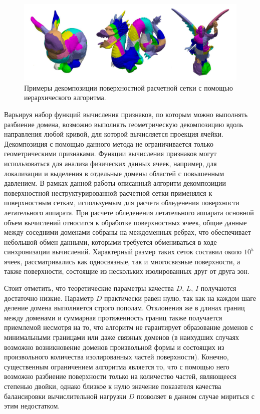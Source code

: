 \documentclass[
11pt,%
tightenlines,%
twoside,%
onecolumn,%
nofloats,%
nobibnotes,%
nofootinbib,%
superscriptaddress,%
noshowpacs,%
centertags]%
{revtex4}
\begin{document}
\begin{figure}[h]
\includegraphics[width=1.0\textwidth]{pics/03-hierarch.pdf}
\caption{Примеры декомпозиции поверхностной расчетной сетки с помощью иерархического алгоритма.}\label{fig:03-hierarch}
\end{figure}

Варьируя набор функций вычисления признаков, по которым можно выполнять разбиение домена, возможно выполнять геометрическую декомпозицию вдоль направления любой кривой, для которой вычисляется проекция ячейки.
Декомпозиция с помощью данного метода не ограничивается только геометрическими признаками.
Функции вычисления признаков могут использоваться для анализа физических данных ячеек, например, для локализации и выделения в отдельные домены областей с повышенным давлением.
В рамках данной работы описанный алгоритм декомпозиции поверхностной неструктурированной расчетной сетки применялся к поверхностным сеткам, используемым для расчета обледенения поверхности летательного аппарата.
При расчете обледенения летательного аппарата основной объем вычислений относится к обработке поверхностных ячеек, общие данные между соседними доменами собраны на междоменных ребрах, что обеспечивает небольшой обмен данными, которыми требуется обмениваться в ходе синхронизации вычислений.
Характерный размер таких сеток составил около $10^5$ ячеек, рассматривались как односвязные, так и многосвязные поверхности, а также поверхности, состоящие из нескольких изолированных друг от друга зон.

Стоит отметить, что теоретические параметры качества $D$, $L$, $I$ получаются достаточно низкие.
Параметр $D$ практически равен нулю, так как на каждом шаге деление домена выполняется строго пополам.
Отклонения же в длинах границ между доменами и суммарная протяженность границ также получается приемлемой несмотря на то, что алгоритм не гарантирует образование доменов с минимальными границами или даже связных доменов (в наихудших случаях возможно возникновение доменов произвольной формы и состоящих из произвольного количества изолированных частей поверхности).
Конечно, существенным ограничением алгоритма является то, что с помощью него возможно разбиение поверхности только на количество частей, являющееся степенью двойки, однако близкое к нулю значение показателя качества балансировки вычислительной нагрузки $D$ позволяет в данном случае мириться с этим недостатком.
\end{document}

